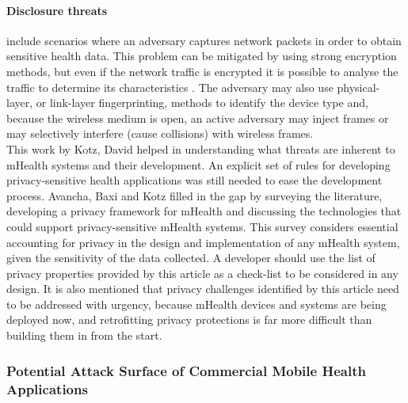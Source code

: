 \paragraph{Disclosure threats} include scenarios where an adversary captures network packets in order to obtain sensitive health data. This problem can be mitigated by using strong encryption methods, but even if the network traffic is encrypted it is possible to analyse the traffic to determine its characteristics \cite{wright2006inferring}. The adversary may also use physical-layer, or link-layer fingerprinting, methods to identify the device type and, because the wireless medium is open, an active adversary may inject frames or may selectively interfere (cause collisions) with wireless frames.\\ %

This work by Kotz, David \cite{kotz2011threat} helped in understanding what threats are inherent to mHealth systems and their development. An explicit set of rules for developing privacy-sensitive health applications was still needed to ease the development process. Avancha, Baxi and Kotz \cite{avancha2012privacy} filled in the gap by surveying the literature, developing a privacy framework for mHealth and discussing the technologies that could support privacy-sensitive mHealth systems. This survey considers essential accounting for privacy in the design and implementation of any mHealth system, given the sensitivity of the data collected. A developer should use the list of privacy properties provided by this article as a check-list to be considered in any design. It is also mentioned that privacy challenges identified by this article need to be addressed with urgency, because mHealth devices and systems are being deployed now, and retrofitting privacy protections is far more difficult than building them in from the start.

 
\subsubsection{Potential Attack Surface of Commercial Mobile Health Applications}


